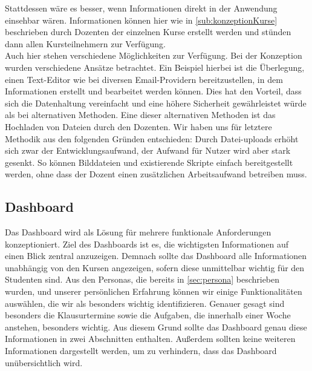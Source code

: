 Stattdessen wäre es besser, wenn Informationen direkt in der Anwendung einsehbar wären. Informationen können hier wie in \autoref{sub:konzeptionKurse} beschrieben durch Dozenten der einzelnen Kurse erstellt werden und stünden dann allen Kursteilnehmern zur Verfügung.\\
Auch hier stehen verschiedene Möglichkeiten zur Verfügung. Bei der Konzeption wurden verschiedene Ansätze betrachtet. Ein Beispiel hierbei ist die Überlegung, einen Text-Editor wie bei diversen Email-Providern bereitzustellen, in dem Informationen erstellt und bearbeitet werden können. Dies hat den Vorteil, dass sich die Datenhaltung vereinfacht und eine höhere Sicherheit gewährleistet würde als bei alternativen Methoden. Eine dieser alternativen Methoden ist das Hochladen von Dateien durch den Dozenten. 
Wir haben uns für letztere Methodik aus den folgenden Gründen entschieden:
Durch Datei-uploads erhöht sich zwar der Entwicklungsaufwand, der Aufwand für Nutzer wird aber stark gesenkt. So können Bilddateien und existierende Skripte einfach bereitgestellt werden, ohne dass der Dozent einen zusätzlichen Arbeitsaufwand betreiben muss.






\subsection{Dashboard}
Das Dashboard wird als Lösung für mehrere funktionale Anforderungen konzeptioniert.
Ziel des Dashboards ist es, die wichtigsten Informationen auf einen Blick zentral anzuzeigen.
Demnach sollte das Dashboard alle Informationen unabhängig von den Kursen angezeigen, sofern diese unmittelbar wichtig für den Studenten sind.
Aus den Personas, die bereits in \autoref{sec:persona} beschrieben wurden, und unserer persönlichen Erfahrung können wir einige Funktionalitäten auswählen, die wir als besonders wichtig identifizieren.
Genauer gesagt sind besonders die Klausurtermine sowie die Aufgaben, die innerhalb einer Woche anstehen, besonders wichtig.
Aus diesem Grund sollte das Dashboard genau diese Informationen in zwei Abschnitten enthalten.
Außerdem sollten keine weiteren Informationen dargestellt werden, um zu verhindern, dass das Dashboard unübersichtlich wird.

